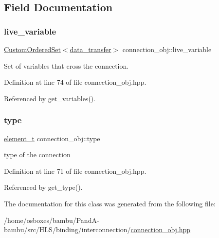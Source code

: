 \subsection{Field Documentation}
\mbox{\label{classconnection__obj_a8aaa77e1cdcf09d010e0f1f712e3fc21}} 
\subsubsection{\texorpdfstring{live\+\_\+variable}{live\_variable}}
{\footnotesize\ttfamily \hyperlink{classCustomOrderedSet}{Custom\+Ordered\+Set}$<$\hyperlink{conn__binding_8hpp_ae44ffa64566f2bb3ce6941833ac940fb}{data\+\_\+transfer}$>$ connection\+\_\+obj\+::live\+\_\+variable\hspace{0.3cm}{\ttfamily [protected]}}



Set of variables that cross the connection. 



Definition at line 74 of file connection\+\_\+obj.\+hpp.



Referenced by get\+\_\+variables().

\mbox{\label{classconnection__obj_ae57fba79883abb4819649e19e4a465cc}} 
\subsubsection{\texorpdfstring{type}{type}}
{\footnotesize\ttfamily \hyperlink{classconnection__obj_a28fc8ddc2893b5ef328f75147a18f6c6}{element\+\_\+t} connection\+\_\+obj\+::type\hspace{0.3cm}{\ttfamily [protected]}}



type of the connection 



Definition at line 71 of file connection\+\_\+obj.\+hpp.



Referenced by get\+\_\+type().



The documentation for this class was generated from the following file\+:\begin{DoxyCompactItemize}
\item 
/home/osboxes/bambu/\+Pand\+A-\/bambu/src/\+H\+L\+S/binding/interconnection/\hyperlink{connection__obj_8hpp}{connection\+\_\+obj.\+hpp}\end{DoxyCompactItemize}
